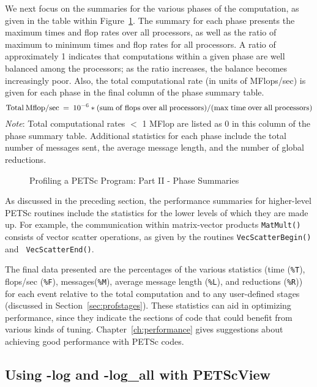 We next focus on the summaries for the various phases of the
computation, as given in the table within Figure~\ref{fig:exparprof2}.  The summary for
each phase presents the maximum times and flop rates over all
processors, as well as the ratio of maximum to minimum times and flop
rates for all processors.  A ratio of approximately 1 indicates that
computations within a given phase are well balanced among the
processors; as the ratio increases, the balance becomes increasingly
poor.  Also, the total computational rate (in units of MFlops/sec) is
given for each phase in the final column of the phase summary table.
\[
   {\rm Total\: Mflop/sec} \:=\: 10^{-6} * ({\rm sum\; of\; flops\; over\; all\; processors})/({\rm max\; time\; over\; all\; processors})
\]
{\em Note}: Total computational rates $<$ 1 MFlop are listed as 0 in this column
of the phase summary table.
Additional statistics for each phase include the total number of messages sent,
the average message length, and the number of global reductions.

\begin{figure}[tb]
\centerline{}
\vspace{-2.5in}
\caption{Profiling a PETSc Program: Part II - Phase Summaries}
\label{fig:exparprof2}
\end{figure}

As discussed in the preceding section, the performance summaries for
higher-level PETSc routines include the statistics for the lower
levels of which they are made up.  For example, the communication within
matrix-vector products {\tt MatMult()} consists of vector scatter
operations, as given by the routines {\tt VecScatterBegin()} and {\tt
VecScatterEnd()}. 
%
%

The final data presented are the percentages of the various statistics
(time ({\tt \%T}), flops/sec ({\tt \%F}), messages({\tt \%M}), average message length ({\tt \%L}),
and reductions ({\tt \%R})) for each event relative to the total computation and to any
user-defined stages (discussed in Section~\ref{sec:profstages}).
These statistics can aid in optimizing performance, since they indicate the sections of code that
could benefit from various kinds of tuning.  Chapter~\ref{ch:performance} gives
suggestions about achieving good performance with PETSc codes.

\subsection{Using -log and -log\_all with PETScView}
 

